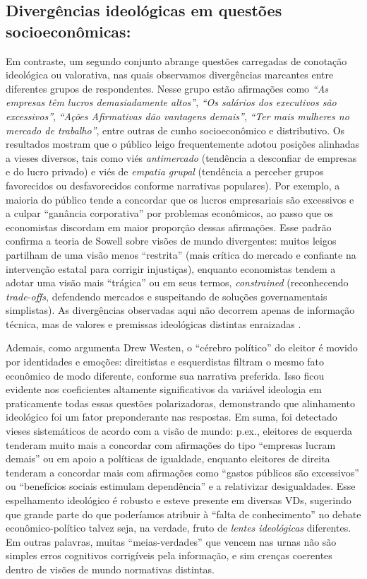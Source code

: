 \subsection{Divergências ideológicas em questões socioeconômicas:} 

Em contraste, um segundo conjunto abrange questões carregadas de conotação ideológica ou valorativa, nas quais observamos divergências marcantes entre diferentes grupos de respondentes. Nesse grupo estão afirmações como \emph{“As empresas têm lucros demasiadamente altos”}, \emph{“Os salários dos executivos são excessivos”}, \emph{“Ações Afirmativas dão vantagens demais”}, \emph{“Ter mais mulheres no mercado de trabalho”}, entre outras de cunho socioeconômico e distributivo. Os resultados mostram que o público leigo frequentemente adotou posições alinhadas a vieses diversos, tais como viés \emph{antimercado} (tendência a desconfiar de empresas e do lucro privado) e viés de \emph{empatia grupal} (tendência a perceber grupos favorecidos ou desfavorecidos conforme narrativas populares). Por exemplo, a maioria do público tende a concordar que os lucros empresariais são excessivos e a culpar “ganância corporativa” por problemas econômicos, ao passo que os economistas discordam em maior proporção dessas afirmações. Esse padrão confirma a teoria de Sowell sobre visões de mundo divergentes: muitos leigos partilham de uma visão menos “restrita” (mais crítica do mercado e confiante na intervenção estatal para corrigir injustiças), enquanto economistas tendem a adotar uma visão mais “trágica” ou em seus termos, \emph{constrained} (reconhecendo \emph{trade-offs}, defendendo mercados e suspeitando de soluções governamentais simplistas). As divergências observadas aqui não decorrem apenas de informação técnica, mas de valores e premissas ideológicas distintas enraizadas \cite{sowell2007conflict}.

Ademais, como argumenta Drew Westen, o “cérebro político” do eleitor é movido por identidades e emoções: direitistas e esquerdistas filtram o mesmo fato econômico de modo diferente, conforme sua narrativa preferida. Isso ficou evidente nos coeficientes altamente significativos da variável ideologia em praticamente todas essas questões polarizadoras, demonstrando que alinhamento ideológico foi um fator preponderante nas respostas. Em suma, foi detectado vieses sistemáticos de acordo com a visão de mundo: p.ex., eleitores de esquerda tenderam muito mais a concordar com afirmações do tipo “empresas lucram demais” ou em apoio a políticas de igualdade, enquanto eleitores de direita tenderam a concordar mais com afirmações como “gastos públicos são excessivos” ou “benefícios sociais estimulam dependência” e a relativizar desigualdades. Esse espelhamento ideológico é robusto e esteve presente em diversas VDs, sugerindo que grande parte do que poderíamos atribuir à “falta de conhecimento” no debate econômico-político talvez seja, na verdade, fruto de \emph{lentes ideológicas} diferentes. Em outras palavras, muitas “meias-verdades” que vencem nas urnas não são simples erros cognitivos corrigíveis pela informação, e sim crenças coerentes dentro de visões de mundo normativas distintas.

